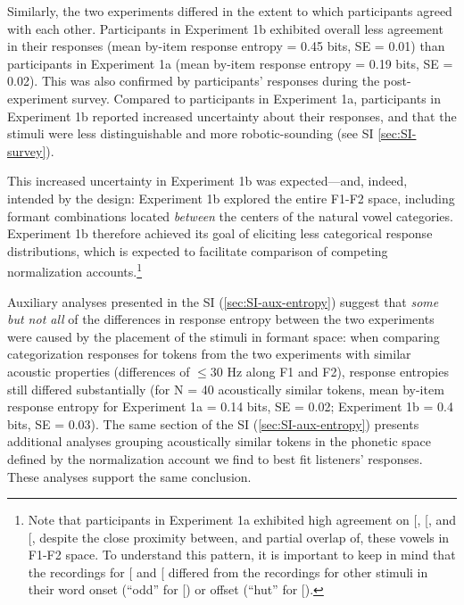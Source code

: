 \documentclass[preprint]{JASA}
\begin{document}
Similarly, the two experiments differed in the extent to which participants agreed with each other. Participants in Experiment 1b exhibited overall less agreement in their responses (mean by-item response entropy = 0.45 bits, SE = 0.01) than participants in Experiment 1a (mean by-item response entropy = 0.19 bits, SE = 0.02). This was also confirmed by participants' responses during the post-experiment survey. Compared to participants in Experiment 1a, participants in Experiment 1b reported increased uncertainty about their responses, and that the stimuli were less distinguishable and more robotic-sounding (see SI \ref{sec:SI-survey}).

This increased uncertainty in Experiment 1b was expected---and, indeed, intended by the design: Experiment 1b explored the entire F1-F2 space, including formant combinations located \emph{between} the centers of the natural vowel categories. Experiment 1b therefore achieved its goal of eliciting less categorical response distributions, which is expected to facilitate comparison of competing normalization accounts.\footnote{Note that participants in Experiment 1a exhibited high agreement on {[}\textipa{2}{]}, {[}\textipa{ae}{]}, and {[}\textipa{A}{]}, despite the close proximity between, and partial overlap of, these vowels in F1-F2 space. To understand this pattern, it is important to keep in mind that the recordings for {[}\textipa{2}{]} and {[}\textipa{A}{]} differed from the recordings for other stimuli in their word onset (``odd'' for {[}\textipa{A}{]}) or offset (``hut'' for {[}\textipa{2}{]}).}

Auxiliary analyses presented in the SI (\ref{sec:SI-aux-entropy}) suggest that \emph{some but not all} of the differences in response entropy between the two experiments were caused by the placement of the stimuli in formant space: when comparing categorization responses for tokens from the two experiments with similar acoustic properties (differences of \(\le 30\) Hz along F1 and F2), response entropies still differed substantially (for N = 40 acoustically similar tokens, mean by-item response entropy for Experiment 1a = 0.14 bits, SE = 0.02; Experiment 1b = 0.4 bits, SE = 0.03). The same section of the SI (\ref{sec:SI-aux-entropy}) presents additional analyses grouping acoustically similar tokens in the phonetic space defined by the normalization account we find to best fit listeners' responses. These analyses support the same conclusion.
\end{document}
